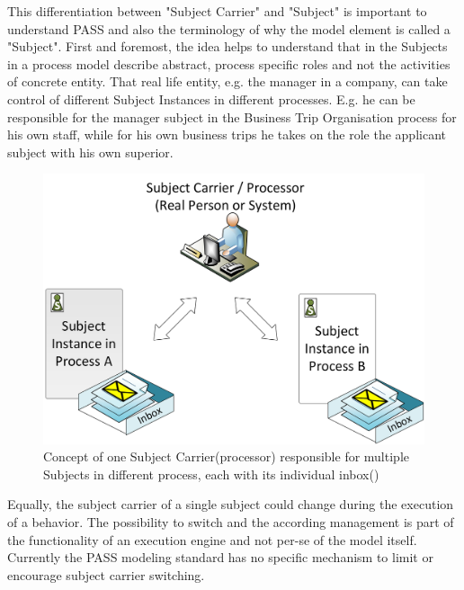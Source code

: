 This differentiation between "Subject Carrier" and "Subject" is important to understand PASS and also the terminology of why the model element is called a "Subject". First and foremost, the idea helps to understand that in the Subjects in a process model describe abstract, process specific roles and not the activities of concrete entity. That real life entity, e.g. the manager in a company, can take control of different Subject Instances in different processes. E.g. he can be responsible for the manager subject in the Business Trip Organisation process for his own staff, while for his own business trips he takes on the role the applicant subject with his own superior.

\begin{figure}[htbp]
	\centering
	\includegraphics[width=0.6\linewidth]{Figures/SubjectCarrierConcept1.png}
	\caption[Concept of one Subject Carrier(processor) responsible for multiple Subjects in different process, each with its individual inbox (\cite{elstermann:diss})]{Concept of one Subject Carrier(processor) responsible for multiple Subjects in different process, each with its individual inbox(\cite{elstermann:diss})}
	\label{fig:subjectCarrierConcept1}
\end{figure}

Equally, the subject carrier of a single subject could change during the execution of a behavior. The possibility to switch and the according management is part of the functionality of an execution engine and not per-se of the model itself. Currently the PASS modeling standard has no specific mechanism to limit or encourage subject carrier switching.

